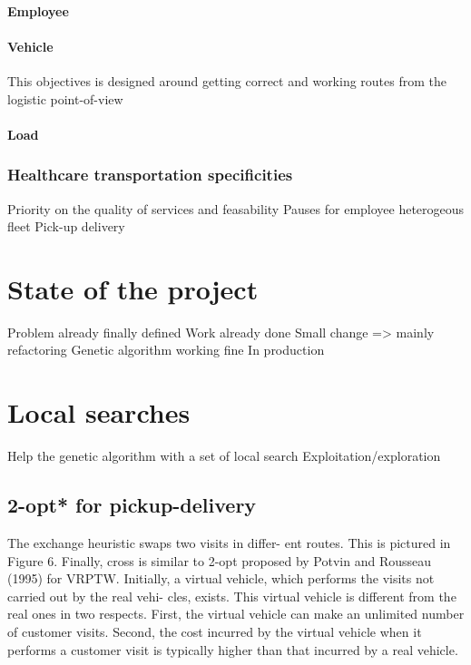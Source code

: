 \documentclass[12pt]{memoir}
\begin{document}
\paragraph{Employee} %
\label{par:Employee}


\paragraph{Vehicle} %
\label{par:Vehicle}
This objectives is designed around getting correct and working routes from the
logistic point-of-view

\paragraph{Load} %
\label{par:Load}


\subsubsection{Healthcare transportation specificities}
\label{sub:Healthcare transportation specificities}
Priority on the quality of services and feasability
Pauses for employee
heterogeous fleet
Pick-up delivery


\section{State of the project}
Problem already finally defined 
Work already done
Small change => mainly refactoring
Genetic algorithm working fine 
In production

\section{Local searches}
Help the genetic algorithm with a set of local search
Exploitation/exploration
\subsection{2-opt* for pickup-delivery}
The exchange heuristic swaps two visits in differ-
ent routes. This is pictured in Figure 6. Finally, cross
is similar to 2-opt {\*}
proposed by Potvin and Rousseau
(1995) for VRPTW. Initially, a virtual vehicle, which
performs the visits not carried out by the real vehi-
cles, exists. This virtual vehicle is different from the
real  ones  in  two  respects.  First,  the  virtual  vehicle
can  make  an  unlimited  number  of  customer  visits.
Second, the cost incurred by the virtual vehicle when
it performs a customer visit is typically higher than
that incurred by a real vehicle.
\end{document}
